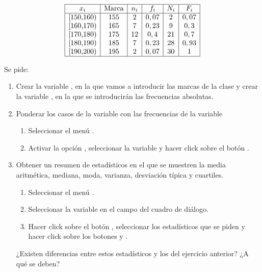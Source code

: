 \begin{enumerate}[leftmargin=*]
\[
\begin{array}{|c|c|c|c|c|c|}
\hline
   x_i   & $Marca$ & n_i & f_i  & N_i & F_i  \\
\hline
 \mbox{[150,160)} &  155   &  2   & 0,07    & 2   &  0,07 \\
 \mbox{[160,170)} &  165   &  7   & 0,23    & 9   &  0,3 \\
 \mbox{[170,180)} &  175   &  12  & 0,4     & 21  &  0,7 \\
 \mbox{[180,190)} &  185   &  7   & 0,23    & 28  &  0,93 \\
 \mbox{[190,200)} &  195   &  2   & 0,07    & 30  &  1 \\
\hline
\end{array}
\]


Se pide:

\begin{enumerate}

\item  Crear la variable , en la que vamos a
introducir las marcas de la clase y crear la variable
, en la que se introducirán las frecuencias
absolutas.

\item Ponderar los casos de la variable   con
las frecuencias de la variable 
\begin{indicacion}
\begin{enumerate}
\item Seleccionar el menú . \item
Activar la opción , seleccionar la
variable  y hacer click sobre el botón
.
\end{enumerate}
\end{indicacion}

\item  Obtener un resumen de estadísticos en el que se muestren la
media aritmética, mediana, moda, varianza, desviación típica y
cuartiles.
\begin{indicacion}
\begin{enumerate}
\item Seleccionar el menú . 
\item Seleccionar la variable  en el 
campo  del cuadro de diálogo. 
\item Hacer click sobre el botón ,
seleccionar los estadísticos que se piden y hacer click sobre los 
botones  y .
\end{enumerate}
\end{indicacion}
¿Existen diferencias entre estos estadísticos y los del ejercicio 
anterior? ¿A qué se deben?


\end{enumerate}
\end{enumerate}
